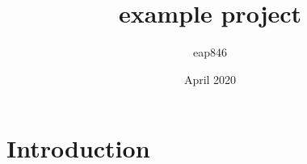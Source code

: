 \documentclass{article}
\title{example project}
\author{eap846 }
\date{April 2020}
\begin{document}
\maketitle

\section{Introduction}
\end{document}
